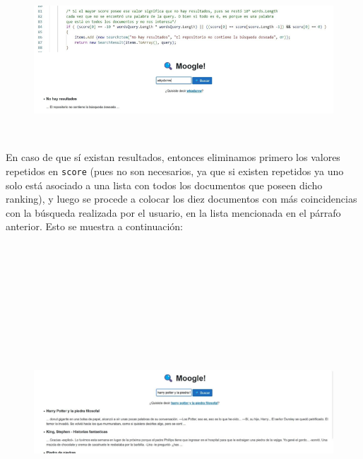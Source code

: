 \documentclass{article}
\begin{document}
\

\begin{figure}[h]
	\begin{center}
		\includegraphics{img7.png}
	\end{center}
\end{figure}


\


En caso de que sí existan resultados, entonces eliminamos primero los valores repetidos en {\texttt{score}}
(pues no son necesarios, ya que si existen repetidos ya uno solo está asociado a una lista con todos
los documentos que poseen dicho ranking), y luego se procede a colocar los diez documentos con
más coincidencias con la búsqueda realizada por el usuario, en la lista mencionada en el párrafo
anterior. Esto se muestra a continuación:


\


\ 


\ 


\ 


\begin{figure}[h]
	\begin{center}
		\includegraphics[width = 17cm, height = 5.5cm]{img8.png}
	\end{center}
\end{figure}


\newpage
\end{document}
